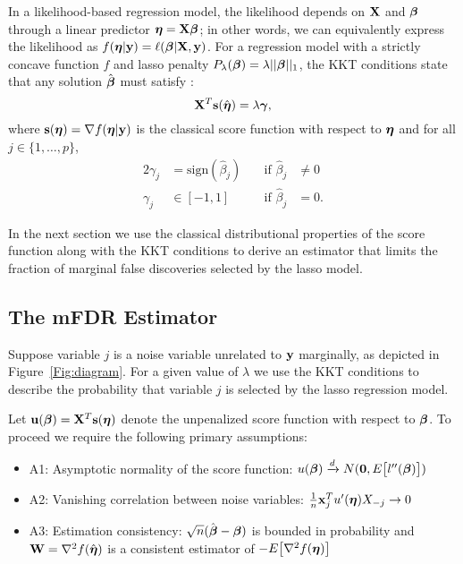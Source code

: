 In a likelihood-based regression model, the likelihood depends on $\mathbf{X}$ and $\boldsymbol{\beta}$ through a linear predictor $\boldsymbol{\eta} = \mathbf{X}\boldsymbol{\beta}$; in other words, we can equivalently express the likelihood as $f(\boldsymbol{\eta}|\mathbf{y})=\ell(\boldsymbol{\beta}|\mathbf{X},\mathbf{y})$.  For a regression model with a strictly concave function $f$ and lasso penalty $P_{\lambda} (\boldsymbol{\beta}) = \lambda||\boldsymbol{\beta}||_1$, the KKT conditions state that any solution $\hat{\boldsymbol{\beta}}$ must satisfy \citep{lasso_kkt}:
\begin{equation*}
\mathbf{X}^T\mathbf{s}(\hat{\boldsymbol{\eta}}) = \lambda\boldsymbol{\gamma},
\end{equation*}
where $\mathbf{s}(\boldsymbol{\eta}) = \nabla f(\boldsymbol{\eta}|\mathbf{y})$ is the classical score function with respect to $\boldsymbol{\eta}$ and for all  $j \in \{1, \ldots, p\}$,
\begin{alignat*}{2}
\gamma_j & = \textrm{sign}(\hat{\beta}_j) &\quad \text{if } \hat{\beta}_j &\neq 0 \\
\gamma_j & \in [-1,1]  &\quad \text{if }  \hat{\beta}_j &= 0.
\end{alignat*}


In the next section we use the classical distributional properties of the score function along with the KKT conditions to derive an estimator that limits the fraction of marginal false discoveries selected by the lasso model.

\subsection{The mFDR Estimator}

Suppose variable $j$ is a noise variable unrelated to $\mathbf{y}$ marginally, as depicted in Figure~\ref{Fig:diagram}. For a given value of $\lambda$ we use the KKT conditions to describe the probability that variable $j$ is selected by the lasso regression model.

Let $\mathbf{u}(\boldsymbol{\beta}) = \mathbf{X}^T \mathbf{s}(\boldsymbol{\eta})$ denote the unpenalized score function with respect to $\boldsymbol{\beta}$.  To proceed we require the following primary assumptions: 

\begin{itemize}
\item A1: Asymptotic normality of the score function: $u(\boldsymbol{\beta}) \xrightarrow{d} N(\mathbf{0},  E\big[l''(\boldsymbol{\beta})\big])$
\item A2: Vanishing correlation between noise variables: $\frac{1}{n}\mathbf{x}_j^T u'(\boldsymbol{\eta})X_{-j} \rightarrow 0$
\item A3: Estimation consistency: $\sqrt{n}(\hat{\boldsymbol{\beta}}-  \boldsymbol{\beta})$ is bounded in probability and $\mathbf{W} = \nabla^2 f(\hat{\boldsymbol{\eta}})$ is a consistent estimator of $-E\big[\nabla^2 f(\boldsymbol{\eta})\big]$
\end{itemize}

